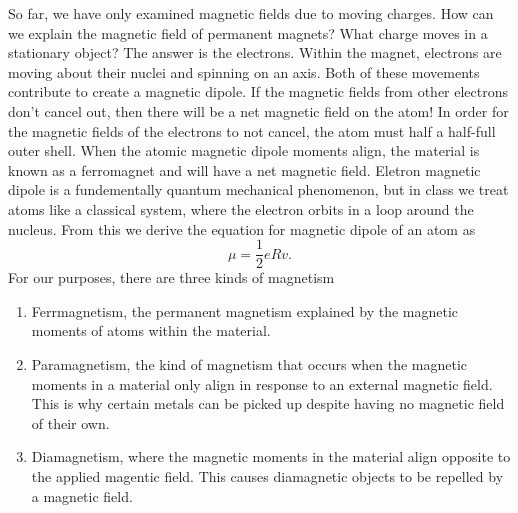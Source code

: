 \documentclass[nobib]{tufte-handout}
\begin{document}
So far, we have only examined magnetic fields due to moving charges. 
How can we explain the magnetic field of permanent magnets? What charge 
moves in a stationary object? The answer is the electrons. Within the 
magnet, electrons are moving about their nuclei and spinning on an axis. 
Both of these movements contribute to create a magnetic dipole.
If the magnetic fields 
from other electrons don't cancel out, then there will 
be a net magnetic field on the atom! In order for the magnetic fields of the 
electrons to not cancel, the atom must half a half-full outer shell. When 
the atomic magnetic dipole moments align, the material is known as a ferromagnet
and will have a net magnetic field. 
Eletron magnetic dipole is a fundementally quantum mechanical phenomenon,
but in class we treat atoms like a classical system,
where the electron orbits in a loop around the nucleus. From this 
we derive the equation for magnetic dipole of an atom as
\[\mu = \frac{1}{2} eRv.\]
For our purposes, there are three kinds of magnetism
\begin{enumerate}
    \item Ferrmagnetism, the permanent magnetism explained by the 
    magnetic moments of atoms within the material. 
    \item Paramagnetism, the kind of magnetism that occurs when 
    the magnetic moments in a material only align in response 
    to an external magnetic field. This is why certain metals can be 
    picked up despite having no magnetic field of their own. 
    \item Diamagnetism, where the magnetic moments in the material align 
    opposite to the applied magentic field. This causes diamagnetic objects 
    to be repelled by a magnetic field. 
\end{enumerate}
\end{document}
